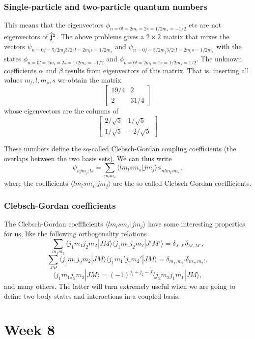 \documentclass[compress]{beamer}
\newcommand{\OP}[1]{{\bf\widehat{#1}}}
\begin{document}
\frame
{
\frametitle{Single-particle and two-particle quantum numbers}

\begin{small}
{\scriptsize
This means that the eigenvectors $\phi_{n=0l=2m_l=2s=1/2m_s=-1/2}$ etc are not eigenvectors of $\OP{j}^2$. The above problems gives a $2\times2$ matrix that mixes the vectors $\psi_{n=0j=5/2m_j3/2;l=2m_ls=1/2m_s}$ and $\psi_{n=0j=3/2m_j3/2;l=2m_ls=1/2m_s}$ with the states  $\phi_{n=0l=2m_l=2s=1/2m_s=-1/2}$ and
$\phi_{n=0l=2m_l=1s=1/2m_s=1/2}$. The unknown coefficients $\alpha$ and $\beta$ results from eigenvectors of this matrix. That is, inserting all values $m_l,l,m_s,s$ we obtain the matrix 
\[
\left[ \begin{array} {cc} 19/4 & 2 \\ 2 & 31/4 \end{array} \right]\]
whose eigenvectors are the columns of
\[
\left[ \begin{array} {cc} 2/\sqrt{5} &1/\sqrt{5}  \\ 1/\sqrt{5} & -2/\sqrt{5} \end{array}\right]\]  

These numbers define the so-called Clebsch-Gordan coupling coefficients  (the overlaps between the two basis sets). We can thus write
\[
\psi_{njm_j;ls}=\sum_{m_lm_s}\langle lm_lsm_s|jm_j\rangle\phi_{nlm_lsm_s},
\]
where the coefficients $\langle lm_lsm_s|jm_j\rangle$ are the so-called Clebsch-Gordan coeffficients.
}
\end{small}
}




\frame
{
\frametitle{Clebsch-Gordan coefficients}

\begin{small}
{\scriptsize
The Clebsch-Gordan coeffficients $\langle lm_lsm_s|jm_j\rangle$ have some interesting properties for us, like the following 
orthogonality relations
\[
\sum_{m_1m_2}\langle j_1m_1j_2m_2|JM\rangle\langle j_1m_1j_2m_2|J'M'\rangle=\delta_{J,J'}\delta_{M,M'},
\]
\[
\sum_{JM}\langle j_1m_1j_2m_2|JM\rangle\langle j_1m_1'j_2m_2'|JM\rangle=\delta_{m_1,m_1'}\delta_{m_2,m_2'},
\]
\[
\langle j_1m_1j_2m_2|JM\rangle=(-1)^{j_1+j_2-J}\langle j_2m_2j_1m_1|JM\rangle,
\]
and many others. The latter will turn extremely useful when we are going to define two-body states and interactions in a coupled basis.
}
\end{small}
}


\section[Week 8]{Week 8}
\end{document}

